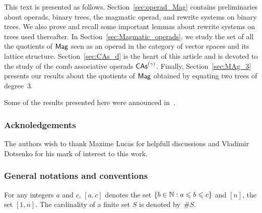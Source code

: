 This text is presented as follows. Section~\ref{sec:operad_Mag} contains
preliminaries about operads, binary trees, the magmatic operad, and
rewrite systems on binary trees. We also prove and recall some important
lemmas about rewrite systems on trees used thereafter. In
Section~\ref{sec:Magmatic_operads}, we study the set of all the
quotients of $\mathsf{Mag}$ seen as an operad in the category of vector spaces
and its lattice structure. Section~\ref{sec:CAs_d} is the heart of this
article and is devoted to the study of the comb associative operads
$\mathsf{CAs}^{\left(\gamma\right)}$. Finally, Section~\ref{sec:MAg_3} presents our results
about the quotients of $\mathsf{Mag}$ obtained by equating two trees of
degree~$3$.
\medbreak

Some of the results presented here were announced in~\cite{CCG18}.
\medbreak

\subsubsection*{Acknoledgements}
The authors wish to thank Maxime Lucas for helpfull discussions and
Vladimir Dotsenko for his mark of interest to this work.

\subsubsection*{General notations and conventions}
For any integers $a$ and $c$, $[a, c]$ denotes the set
$\{b \in \mathbb{N} : a \leqslant b \leqslant c\}$ and $[n]$, the set $[1, n]$. The
cardinality of a finite set $S$ is denoted by~$\# S$.
\medbreak
